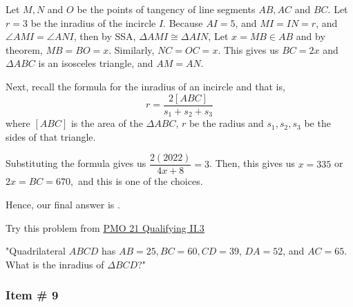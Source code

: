 \documentclass[11pt,paper=letter]{scrartcl}
\begin{document}
\begin{center}
\end{center}

Let $M, N$ and $O$ be the points of tangency of line segments $AB, AC$ and $BC.$ Let $r=3$ be the inradius of the incircle $I$. Because $AI = 5$, and $MI = IN = r$, and $\angle AMI = \angle ANI$, then by SSA, $\Delta AMI \cong \Delta AIN$, Let $x = MB \in AB$ and by theorem, $MB = BO = x$. Similarly, $NC = OC = x$. This gives us $BC = 2x$ and $\Delta ABC$ is an isosceles triangle, and $AM =AN$.

Next, recall the formula for the inradius of an incircle and that is, $$r = \dfrac{2[ABC]}{s_1 + s_2 + s_3}$$ where $[ABC]$ is the area of the $\Delta ABC$, $r$ be the radius and $s_1,s_2,s_3$ be the sides of that triangle. 

Substituting the formula gives us $\dfrac{2(2022)}{4x + 8} = 3$. Then, this gives us $x = 335 $ or $2x = BC = 670,$ and this is one of the choices.
    


Hence, our final answer is .

\begin{mdframed}
\begin{rem} Try this problem from \href{https://pmo.ph/wp-content/uploads/2019/01/21st-PMO-Qualifying-Stage.pdf}{PMO 21 Qualifying II.3}

"Quadrilateral $ABCD$ has $AB = 25, BC = 60, CD = 39$, $DA = 52$, and $AC = 65$. What is the
inradius of $\Delta BCD$?"

\end{rem}
\end{mdframed}
\subsubsection{Item \# 9}
\end{document}
